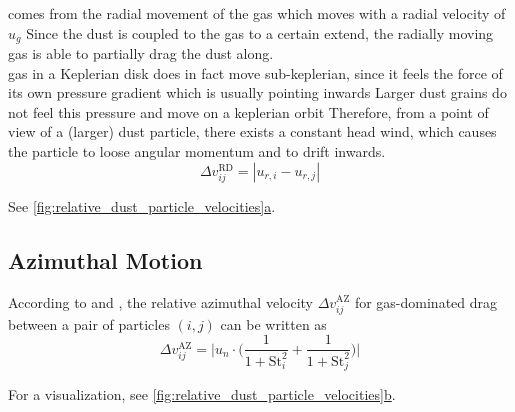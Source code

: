 
            comes from the radial movement of the gas 
            which moves with a radial velocity of $u_g$
            Since the dust is coupled to the gas to a certain extend, 
            the radially moving gas is able to partially drag the dust along. \\

             gas in a Keplerian disk does in fact move sub-keplerian, 
             since it feels the force of its own pressure gradient which is usually pointing inwards
             Larger dust grains do not feel this pressure and move on a keplerian orbit
             Therefore, from a point of view of a (larger) dust particle, 
             there exists a constant head wind, 
             which causes the particle to loose angular momentum and to drift inwards. \\

        \begin{equation}
            \Delta v_{ij}^\text{RD}
            =|u_{r,i}-u_{r,j}|
        \end{equation}
    
        See \hyperref[fig:relative_dust_particle_velocities]
        {\cref*{fig:relative_dust_particle_velocities}a}.

    \clearpage\subsection{Azimuthal Motion}

        According to \cite{weidenschilling_1977} and \cite{nakagawa_1986}, the relative azimuthal 
        velocity $\Delta v^\text{AZ}_{ij}$ for gas-dominated drag between a pair of particles 
        $(i, j)$ can be written as
        \begin{equation}
            \Delta v^\text{AZ}_{ij}=\bigg|
                u_n\cdot\bigg(
                    \frac{1}{1+\text{St}_i^2}+
                    \frac{1}{1+\text{St}_j^2}
                \bigg)
            \bigg|
        \end{equation}
    
        For a visualization, see \hyperref[fig:relative_dust_particle_velocities]
        {\cref*{fig:relative_dust_particle_velocities}b}.

